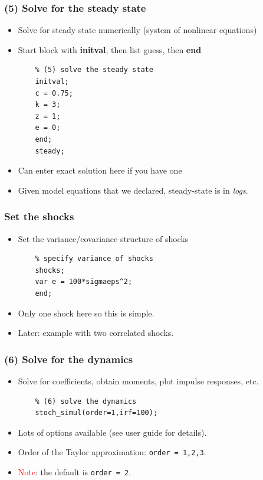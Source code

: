 \documentclass{beamer}
\begin{document}
\begin{frame}[fragile]
\frametitle{(5) Solve for the steady state}
\begin{itemize}
	\item Solve for steady state numerically (system of nonlinear equations)
	\item Start block with \textbf{initval}, then list guess, then \textbf{end}
	\begin{verbatim}
	% (5) solve the steady state
	initval;
	c = 0.75;
	k = 3;
	z = 1;
	e = 0;
	end;
	steady;
	\end{verbatim}
	\item Can enter exact solution here if you have one
	\item Given model equations that we declared, steady-state is in \textit{logs}.
\end{itemize}
\end{frame}

\begin{frame}[fragile]
\frametitle{Set the shocks}
\begin{itemize}
	\item Set the variance/covariance structure of shocks
	\begin{verbatim}
	% specify variance of shocks
	shocks;
	var e = 100*sigmaeps^2;
	end;
	\end{verbatim}
	\item Only one shock here so this is simple.
	\item Later: example with two correlated shocks.
\end{itemize}
\end{frame}

\begin{frame}[fragile]
\frametitle{(6) Solve for the dynamics}
\begin{itemize}
	\item Solve for coefficients, obtain moments, plot impulse responses, etc.
	\begin{verbatim}
	% (6) solve the dynamics
	stoch_simul(order=1,irf=100);
	\end{verbatim}
	\item Lots of options available (see user guide for details).
	\item Order of the Taylor approximation: \texttt{order = 1,2,3}.
	\item \textcolor{red}{Note}: the default is \texttt{order = 2}.
\end{itemize}
\end{frame}
\end{document}
